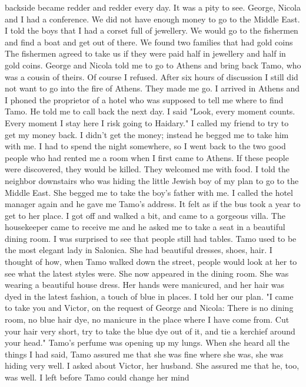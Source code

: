 backside became redder and redder every day. It was a pity to see. 
George, Nicola and I had a conference. We did not have enough money to go to the Middle East. I told the boys that I had a corset full of jewellery. We would go to the fishermen and find a boat and get out of there. We found two families that had gold coins The fishermen agreed to take us  if they were paid half in jewellery and half in gold coins. 
George and Nicola told me to go to Athens and bring back Tamo, who 
was a cousin of theirs. Of course I refused. After six hours of discussion I still did not want to go into the fire of Athens. They made me go. 
I arrived in Athens and I phoned the proprietor of a hotel who was 
supposed to tell me where to find Tamo. He told me to call back the 
next day. I said "Look, every moment counts. Every moment I stay here 
I risk going to Haidary." I called my friend to try to get my money back.
I didn't get the money; instead he begged me to take him with me. 
I had to spend the night somewhere, so I went back to the two good 
people who had rented me a room when I first came to Athens. If these 
people were discovered, they would be killed. They welcomed me with 
food. I told the neighbor downstairs who was hiding the little Jewish 
boy of my plan to go to the Middle East. She begged me to take the 
boy's father with me. 
I called the hotel manager again and he gave me Tamo's address. 
It felt as if the bus took a year to get to her place. I got off and 
walked a bit, and came to a gorgeous villa. The housekeeper came to 
receive me and he asked me to take a seat in a beautiful dining room. 
I was surprised to see that people still had tables. 
Tamo used to be the most elegant lady in Salonica. She had beautiful dresses, shoes, hair. I thought of how, when Tamo walked down the street, people would look at her to see what the latest styles were. 
She now appeared in the dining room. She was wearing a beautiful house  
dress. Her hands were manicured, and her hair was dyed in the latest 
fashion, a touch of blue in places. I told her our plan. 
"I came to take you and Victor, on the request of George and Nicola: There is no dining room, no blue hair dye, no manicure in the place where I have come from. Cut your hair very short, try to take the blue dye out of it, and tie a kerchief around your head."  
Tamo's perfume was opening up my lungs. When she heard all the 
things I had said, Tamo assured me that she was fine where she was, she 
was hiding very well. I asked about Victor, her husband. She assured 
me that he, too, was well. I left before Tamo could change her mind 
